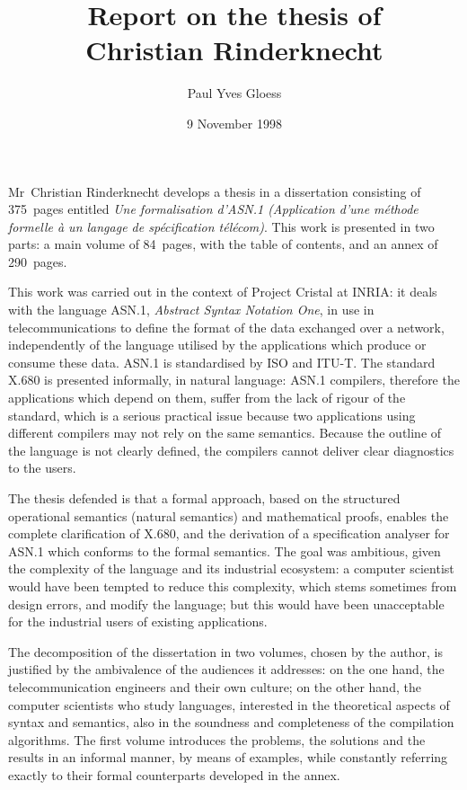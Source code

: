 \documentclass[a4paper,11pt,twoside]{article}
\title{\Huge Report on the thesis of\\ Christian Rinderknecht}
\author{\Large Paul Yves Gloess}
\date{9 November 1998}
\begin{document}
\maketitle

Mr~Christian Rinderknecht develops a thesis in a dissertation
consisting of 375~pages entitled \emph{Une formalisation d'ASN.1
  (Application d'une m\'ethode formelle \`a un langage de
  sp\'ecification t\'el\'ecom)}. This work is presented in two parts:
a main volume of 84~pages, with the table of contents, and an annex of
290~pages.

This work was carried out in the context of Project Cristal at INRIA:
it deals with the language ASN.1, \emph{Abstract Syntax Notation One},
in use in telecommunications to define the format of the data
exchanged over a network, independently of the language utilised by
the applications which produce or consume these data. ASN.1 is
standardised by ISO and ITU-T. The standard X.680 is presented
informally, in natural language: ASN.1 compilers, therefore the
applications which depend on them, suffer from the lack of rigour of
the standard, which is a serious practical issue because two
applications using different compilers may not rely on the same
semantics. Because the outline of the language is not clearly defined,
the compilers cannot deliver clear diagnostics to the users.

The thesis defended is that a formal approach, based on the structured
operational semantics (natural semantics) and mathematical proofs,
enables the complete clarification of X.680, and the derivation of a
specification analyser for ASN.1 which conforms to the formal
semantics. The goal was ambitious, given the complexity of the
language and its industrial ecosystem: a computer scientist would have
been tempted to reduce this complexity, which stems sometimes from
design errors, and modify the language; but this would have been
unacceptable for the industrial users of existing applications.

The decomposition of the dissertation in two volumes, chosen by the
author, is justified by the ambivalence of the audiences it addresses:
on the one hand, the telecommunication engineers and their own
culture; on the other hand, the computer scientists who study
languages, interested in the theoretical aspects of syntax and
semantics, also in the soundness and completeness of the compilation
algorithms. The first volume introduces the problems, the solutions
and the results in an informal manner, by means of examples, while
constantly referring exactly to their formal counterparts developed in
the annex.
\end{document}
